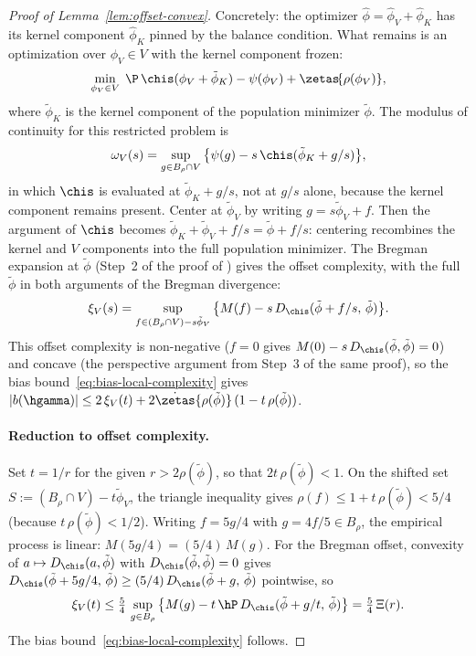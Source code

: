 \documentclass{article}
\begin{document}
\begin{proof}[Proof of Lemma~\ref{lem:offset-convex}]
Concretely:
the optimizer
$\hat\phi = \hat\phi_V + \hat\phi_K$
has its kernel component $\hat\phi_K$
pinned by the balance condition.
What remains is an optimization
over $\phi_V \in V$
with the kernel component frozen:
\[
\min_{\phi_V \in V}\;
  \P\,\chis(\phi_V + \tilde\phi_K)
  - \psi(\phi_V)
  + \zetas\!\qty{\rho(\phi_V)},
\]
where $\tilde\phi_K$ is the kernel component
of the population minimizer $\tilde\phi$.
The modulus of continuity
for this restricted problem is
\[
\omega_V(s)
  = \sup_{g \in B_\rho \cap V}
    \qty{\psi(g) - s\,\chis(\tilde\phi_K + g/s)},
\]
in which $\chis$ is evaluated
at $\tilde\phi_K + g/s$,
not at $g/s$ alone,
because the kernel component remains present.
Center at $\tilde\phi_V$
by writing $g = s\tilde\phi_V + f$.
Then the argument of $\chis$ becomes
$\tilde\phi_K + \tilde\phi_V + f/s
  = \tilde\phi + f/s$:
centering recombines the kernel
and $V$ components
into the full population minimizer.
The Bregman expansion at $\tilde\phi$
(Step~2 of the proof of
)
gives the offset complexity,
with the full $\tilde\phi$
in both arguments of the Bregman divergence:
\[
\xi_V(s)
  = \sup_{f \in (B_\rho \cap V) - s\tilde\phi_V}
  \qty{M(f)
    - s\,D_{\chis}(\tilde\phi + f/s,\, \tilde\phi)}.
\]
This offset complexity is non-negative
($f = 0$ gives
$M(0) - s\,D_{\chis}(\tilde\phi, \tilde\phi) = 0$)
and concave
(the perspective argument
from Step~3 of the same proof),
so the bias bound~\eqref{eq:bias-local-complexity} gives
$|b(\hgamma)|
  \le 2\,\xi_V(t)
  + 2\dot\zetas\{\rho(\tilde\phi)\}\,(1 - t\,\rho(\tilde\phi))$.

\paragraph{Reduction to offset complexity.}
Set $t = 1/r$
for the given $r > 2\rho(\tilde\phi)$,
so that $2t\,\rho(\tilde\phi) < 1$.
On the shifted set
$S := (B_\rho \cap V) - t\tilde\phi_V$,
the triangle inequality gives
$\rho(f) \le 1 + t\,\rho(\tilde\phi) < 5/4$
(because $t\,\rho(\tilde\phi) < 1/2$).
Writing $f = 5g/4$
with $g = 4f/5 \in B_\rho$,
the empirical process is linear:
$M(5g/4) = (5/4)\, M(g)$.
For the Bregman offset,
convexity of $a \mapsto D_{\chis}(a, \tilde\phi)$
with $D_{\chis}(\tilde\phi, \tilde\phi) = 0$
gives
$D_{\chis}(\tilde\phi + 5g/4,\, \tilde\phi)
  \ge (5/4)\, D_{\chis}(\tilde\phi + g,\, \tilde\phi)$
pointwise,
so
\begin{equation}
\label{eq:xi-V-to-Xi}
\xi_V(t)
  \le \tfrac{5}{4}\, \sup_{g \in B_\rho}
    \qty{M(g) - t\, \hP\, D_{\chis}(\tilde\phi + g/t,\, \tilde\phi)}
  = \tfrac{5}{4}\, \Xi(r).
\end{equation}
The bias bound~\eqref{eq:bias-local-complexity} follows.
\end{proof}
\end{document}
